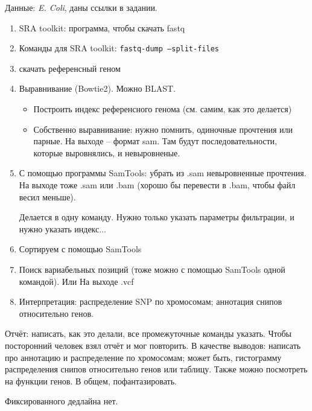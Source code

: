 \documentclass[main.tex]{subfiles}
\begin{document}
Данные: \textit{E. Coli}, даны ссылки в задании.

\begin{enumerate}[noitemsep]
	\item SRA toolkit: программа, чтобы скачать fastq
	\item Команды для SRA toolkit: \texttt{fastq-dump --split-files}
	\item скачать референсный геном
	\item Выравнивание (Bowtie2). Можно BLAST.
	\begin{itemize}[noitemsep]
		\item Построить индекс референсного генома (см. самим, как это делается)
		\item \subitem Собственно выравнивание: нужно помнить, одиночные прочтения или парные.
		На выходе -- формат sam.
		Там будут последовательности, которые выровнялись, и невыровненые.
	\end{itemize}
	\item С помощью программы SamTools: убрать из .sam невыровненные прочтения.
	На выходе тоже .sam или .bam (хорошо бы перевести в .bam, чтобы файл весил меньше).
	
	Делается в одну команду.
	Нужно только указать параметры фильтрации, и нужно указать индекс...
	
	\item Сортируем с помощью SamTools
	\item Поиск вариабельных позиций (тоже можно с помощью SamTools одной командой).
	Или 
	На выходе .vcf
	\item Интерпретация: распределение SNP по хромосомам; аннотация снипов относительно генов.
\end{enumerate}

Отчёт: написать, как это делали, все промежуточные команды указать.
Чтобы посторонний человек взял отчёт и мог повторить.
В качестве выводов: написать про аннотацию и распределение по хромосомам;
может быть, гистограмму распределения снипов относительно генов или таблицу.
Также можно посмотреть на функции генов.
В общем, пофантазировать.

Фиксированного дедлайна нет.
\end{document}
